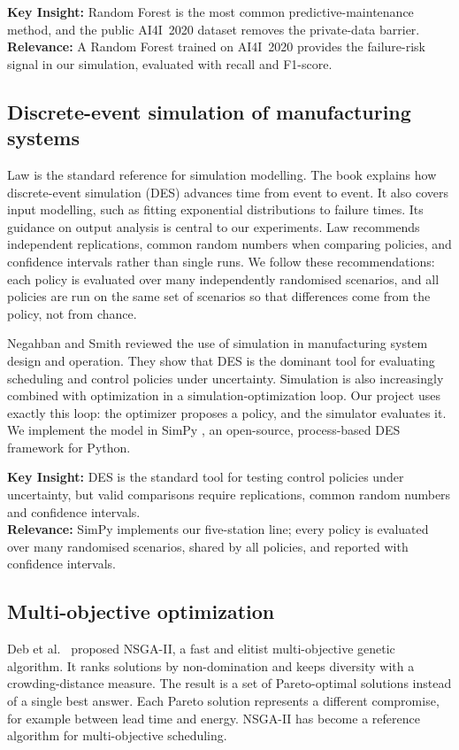 \documentclass[11pt,a4paper]{article}
\begin{document}
\textbf{Key Insight:} Random Forest is the most common predictive-maintenance method, and the public AI4I~2020 dataset removes the private-data barrier.\\
\textbf{Relevance:} A Random Forest trained on AI4I~2020 provides the failure-risk signal in our simulation, evaluated with recall and F1-score.

\subsection{Discrete-event simulation of manufacturing systems}
Law \cite{law2015} is the standard reference for simulation modelling. The book explains how discrete-event simulation (DES) advances time from event to event. It also covers input modelling, such as fitting exponential distributions to failure times. Its guidance on output analysis is central to our experiments. Law recommends independent replications, common random numbers when comparing policies, and confidence intervals rather than single runs. We follow these recommendations: each policy is evaluated over many independently randomised scenarios, and all policies are run on the same set of scenarios so that differences come from the policy, not from chance.

Negahban and Smith \cite{negahban2014} reviewed the use of simulation in manufacturing system design and operation. They show that DES is the dominant tool for evaluating scheduling and control policies under uncertainty. Simulation is also increasingly combined with optimization in a simulation-optimization loop. Our project uses exactly this loop: the optimizer proposes a policy, and the simulator evaluates it. We implement the model in SimPy \cite{simpy}, an open-source, process-based DES framework for Python.

\textbf{Key Insight:} DES is the standard tool for testing control policies under uncertainty, but valid comparisons require replications, common random numbers and confidence intervals.\\
\textbf{Relevance:} SimPy implements our five-station line; every policy is evaluated over many randomised scenarios, shared by all policies, and reported with confidence intervals.

\subsection{Multi-objective optimization}
Deb et al.\ \cite{deb2002} proposed NSGA-II, a fast and elitist multi-objective genetic algorithm. It ranks solutions by non-domination and keeps diversity with a crowding-distance measure. The result is a set of Pareto-optimal solutions instead of a single best answer. Each Pareto solution represents a different compromise, for example between lead time and energy. NSGA-II has become a reference algorithm for multi-objective scheduling.
\end{document}
